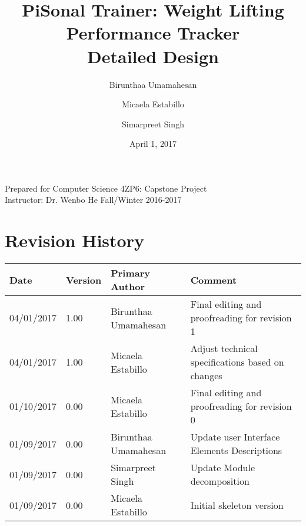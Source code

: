 \documentclass{article}
\title{
PiSonal Trainer: Weight Lifting Performance Tracker\\
\Large {Detailed Design}
}
\date{April 1, 2017}
\author{Birunthaa Umamahesan \and Micaela Estabillo \and Simarpreet Singh}
\begin{document}
\thispagestyle{plain}
\maketitle
\vfill
\begin{center}
    Prepared for Computer Science 4ZP6: Capstone Project \\
    Instructor: Dr. Wenbo He
    Fall/Winter 2016-2017\\
\end{center}
\newpage

\tableofcontents

\listoffigures

\listoftables

\thispagestyle{plain}

\newpage

\section*{Revision History}
\begingroup
\begin{tabular}{ | p{2cm} | p{1.5cm} | p{3.8cm} | p{7cm} |} 
    \hline
    \textbf{Date} & \textbf{Version} & \textbf{Primary Author} & \textbf{Comment}\\
    \hline
    04/01/2017 & 1.00 & Birunthaa Umamahesan & Final  editing and proofreading for revision 1\\ 
    \hline
    04/01/2017 & 1.00 & Micaela Estabillo & Adjust technical specifications based on changes\\ 
    \hline
    01/10/2017 & 0.00 & Micaela Estabillo & Final editing and proofreading for revision 0\\ 
    \hline
    01/09/2017 & 0.00 & Birunthaa Umamahesan & Update user Interface Elements Descriptions \\
    \hline
    01/09/2017 & 0.00 & Simarpreet Singh & Update Module decomposition\\ 
    \hline
    01/09/2017 & 0.00 & Micaela Estabillo & Initial skeleton version\\
    \hline
\end{tabular}
\endgroup


\begin{center}
\end{center}
\end{document}
